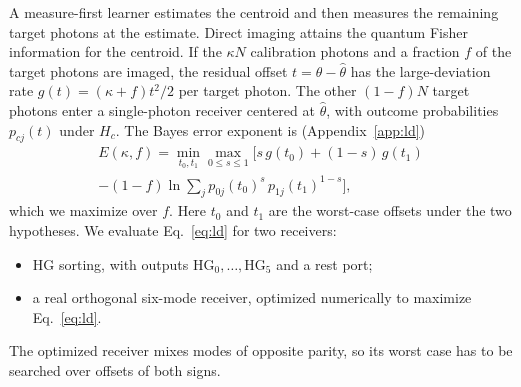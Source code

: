 \documentclass[reprint,pra,aps,amsmath,amssymb,superscriptaddress,nofootinbib]{revtex4-2}
\begin{document}
A measure-first learner estimates the centroid and then measures the remaining target photons at the estimate.
Direct imaging attains the quantum Fisher information for the centroid. If the $\kappa N$ calibration photons and a
fraction $f$ of the target photons are imaged, the residual offset $t=\theta-\hat\theta$ has the large-deviation rate
$g(t)=(\kappa+f)t^2/2$ per target photon. The other $(1-f)N$ target photons enter a single-photon receiver centered
at $\hat\theta$, with outcome probabilities $p_{cj}(t)$ under $H_c$. The Bayes error exponent is
(Appendix~\ref{app:ld})
\begin{multline}
E(\kappa,f)=\min_{t_0,t_1}\max_{0\le s\le1}\Big[s\,g(t_0)+(1-s)\,g(t_1)\\
-(1-f)\ln\sum_j p_{0j}(t_0)^s\,p_{1j}(t_1)^{1-s}\Big],
\label{eq:ld}
\end{multline}
which we maximize over $f$. Here $t_0$ and $t_1$ are the worst-case offsets under the two hypotheses. We evaluate
Eq.~\eqref{eq:ld} for two receivers:
\begin{itemize}
\item HG sorting, with outputs $\mathrm{HG}_0,\dots,\mathrm{HG}_5$ and a rest port;
\item a real orthogonal six-mode receiver, optimized numerically to maximize Eq.~\eqref{eq:ld}.
\end{itemize}
The optimized receiver mixes modes of opposite parity, so its worst case has to be searched over offsets of both
signs.

\begin{table}[t]
\caption{Error exponents per target photon in units of the known-pointing quantum limit $a_0^2$ ($a_0=0.1$).
Measure-first learners combine direct-imaging centroiding, with $\kappa$ calibration photons per target photon and a
fraction $f^\ast$ of the target photons, with HG sorting or with an optimized six-mode receiver. ``Coherent
references'' projects each target photon jointly with $\kappa$ calibration photons onto their symmetric subspace.
The measure-first values are identical to three digits for $a_0=0.05$ and 0.2. Generated from
\texttt{results/qx3e/qx3e.json}.}
\label{tab:exponents}

\end{table}
\end{document}
